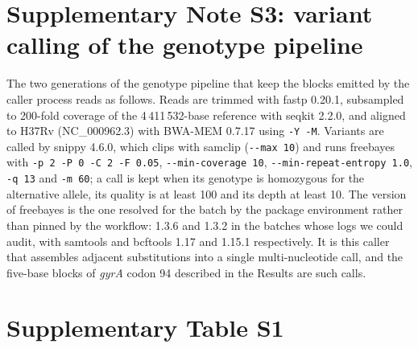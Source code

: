 \documentclass[11pt]{article}
\begin{document}
\section*{Supplementary Note S3: variant calling of the genotype pipeline}

The two generations of the genotype pipeline that keep the blocks emitted by the caller
\cite{senelle2023} process reads as follows. Reads are trimmed with fastp 0.20.1, subsampled
to 200-fold coverage of the 4\,411\,532-base reference with seqkit 2.2.0, and aligned to H37Rv
(NC\_000962.3) with BWA-MEM 0.7.17 using \texttt{-Y -M}. Variants are called by snippy 4.6.0,
which clips with samclip (\texttt{-{}-max 10}) and runs freebayes with \texttt{-p 2 -P 0 -C 2
-F 0.05}, \texttt{-{}-min-coverage 10}, \texttt{-{}-min-repeat-entropy 1.0}, \texttt{-q 13}
and \texttt{-m 60}; a call is kept when its genotype is homozygous for the alternative allele,
its quality is at least 100 and its depth at least 10. The version of freebayes is the one
resolved for the batch by the package environment rather than pinned by the workflow: 1.3.6
and 1.3.2 in the batches whose logs we could audit, with samtools and bcftools 1.17 and
1.15.1 respectively. It is this caller that assembles adjacent substitutions into a single
multi-nucleotide call, and the five-base blocks of \textit{gyrA} codon 94 described in the
Results are such calls.

\section*{Supplementary Table S1}

\begin{table}[h]
\centering
\small
\caption*{\textbf{Supplementary Table S1.} The nineteen pairs of a coordinate string and a
medicine that receive both a verdict of association with resistance and a verdict of absence
of association under the catalogue that emits every representation (C1). Eleven of the
nineteen pairs concern rifampicin, and all eleven strings fall within the \textit{rpoB}
resistance-determining region; the eight others concern the two fluoroquinolones (five
pairs), ethambutol, pyrazinamide and amikacin. Seventeen distinct strings are involved, two
of them for two medicines each. Strings are in the zero-based coordinate convention of the
project, as \texttt{NC\_000962.3:position:reference:alternative}. Source:
\texttt{p77\_conflits\_C1.tsv}; the same table is provided as
\texttt{TableS1\_contradictory\_pairs\_C1.csv}.}

\end{table}
\end{document}
